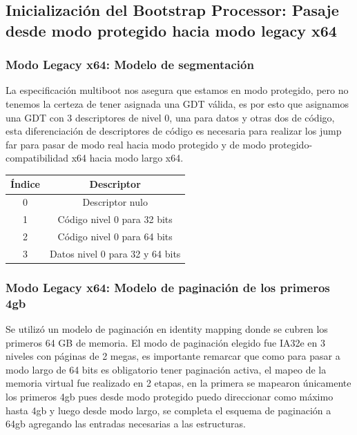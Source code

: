 \subsection{Inicialización del Bootstrap Processor: Pasaje desde modo protegido hacia modo legacy x64}
    \subsubsection{Modo Legacy x64: Modelo de segmentación}    
    La especificación multiboot nos asegura que estamos en modo protegido, pero no tenemos la certeza de tener asignada una GDT válida, es por esto que asignamos una GDT con 
    3 descriptores de nivel 0, una para datos y otras dos de código, esta diferenciación de descriptores de código es necesaria para realizar los jump far para pasar de modo real hacia modo protegido y de modo protegido-compatibilidad x64 hacia modo largo x64.

\vspace{0.5cm}
\begin{center}
    \begin{tabular}{|c|c|}
        \hline
        Índice & Descriptor\\
        \hline
        0 & Descriptor nulo\\
        \hline
        1 & Código nivel 0 para 32 bits\\
        \hline
        2 & Código nivel 0 para 64 bits\\
        \hline
        3 & Datos nivel 0 para 32 y 64 bits\\
        \hline
    \end{tabular}
\end{center}
\vspace{0.5cm}

\subsubsection{Modo Legacy x64: Modelo de paginación de los primeros 4gb}
    Se utilizó un modelo de paginación en identity mapping donde se cubren los primeros 64 GB de memoria. El modo de paginación elegido fue IA32e en 3 niveles con páginas de 2 megas, es importante remarcar que como para pasar a modo largo de 64 bits es obligatorio tener paginación activa, el mapeo de la memoria virtual fue realizado en 2 etapas, en la primera se mapearon únicamente los primeros 4gb pues desde modo protegido puedo direccionar como máximo hasta 4gb y luego desde modo largo, se completa el esquema de paginación a 64gb agregando las entradas necesarias a las estructuras.
    \\

